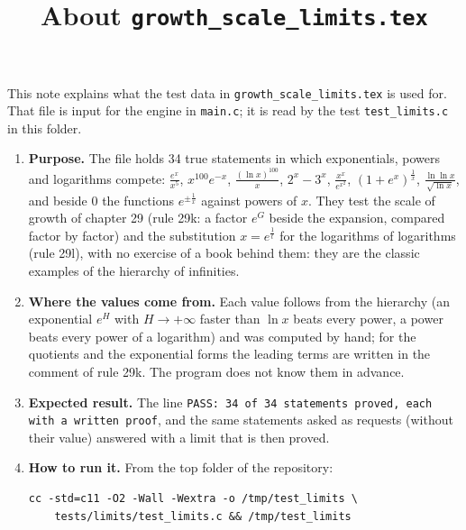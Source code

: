 \documentclass[11pt,a4paper]{article}
\title{About \texttt{growth\_scale\_limits.tex}}
\author{}
\date{}
\begin{document}
\maketitle
This note explains what the test data in \texttt{growth\_scale\_limits.tex} is used for. That file is input for the engine in \texttt{main.c}; it is read by the test \texttt{test\_limits.c} in this folder.

\begin{enumerate}
\item \textbf{Purpose.} The file holds 34 true statements in which exponentials, powers and logarithms compete: $\frac{e^{x}}{x^{5}}$, $x^{100} e^{-x}$, $\frac{(\ln x)^{100}}{x}$, $2^{x} - 3^{x}$, $\frac{x^{x}}{e^{x^{2}}}$, $(1 + e^{x})^{\frac{1}{x}}$, $\frac{\ln \ln x}{\sqrt{\ln x}}$, and beside $0$ the functions $e^{\pm\frac{1}{x}}$ against powers of $x$. They test the scale of growth of chapter 29 (rule 29k: a factor $e^{G}$ beside the expansion, compared factor by factor) and the substitution $x = e^{\frac{1}{t}}$ for the logarithms of logarithms (rule 29l), with no exercise of a book behind them: they are the classic examples of the hierarchy of infinities.

\item \textbf{Where the values come from.} Each value follows from the hierarchy (an exponential $e^{H}$ with $H \to +\infty$ faster than $\ln x$ beats every power, a power beats every power of a logarithm) and was computed by hand; for the quotients and the exponential forms the leading terms are written in the comment of rule 29k. The program does not know them in advance.

\item \textbf{Expected result.} The line \texttt{PASS: 34 of 34 statements proved, each with a written proof}, and the same statements asked as requests (without their value) answered with a limit that is then proved.

\item \textbf{How to run it.} From the top folder of the repository:
\begin{verbatim}
cc -std=c11 -O2 -Wall -Wextra -o /tmp/test_limits \
    tests/limits/test_limits.c && /tmp/test_limits
\end{verbatim}
\end{enumerate}
\end{document}
